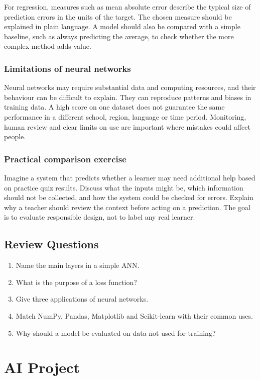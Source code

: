 \documentclass[11pt,openany,oneside]{book}
\begin{document}
For regression, measures such as mean absolute error describe the typical size of prediction errors in the units of the target. The chosen measure should be explained in plain language. A model should also be compared with a simple baseline, such as always predicting the average, to check whether the more complex method adds value.

\subsection{Limitations of neural networks}
Neural networks may require substantial data and computing resources, and their behaviour can be difficult to explain. They can reproduce patterns and biases in training data. A high score on one dataset does not guarantee the same performance in a different school, region, language or time period. Monitoring, human review and clear limits on use are important where mistakes could affect people.

\subsection{Practical comparison exercise}
Imagine a system that predicts whether a learner may need additional help based on practice quiz results. Discuss what the inputs might be, which information should not be collected, and how the system could be checked for errors. Explain why a teacher should review the context before acting on a prediction. The goal is to evaluate responsible design, not to label any real learner.

\section*{Review Questions}
\begin{enumerate}
\item Name the main layers in a simple ANN.
\item What is the purpose of a loss function?
\item Give three applications of neural networks.
\item Match NumPy, Pandas, Matplotlib and Scikit-learn with their common uses.
\item Why should a model be evaluated on data not used for training?
\end{enumerate}

\chapter{AI Project}
\end{document}
